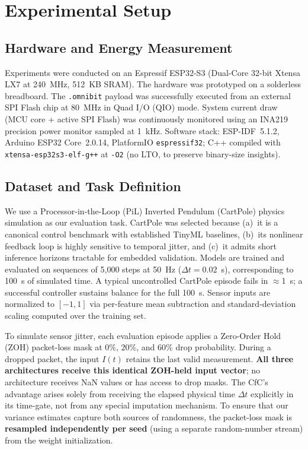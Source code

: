 \documentclass[conference]{IEEEtran}
\newcommand{\dt}{\Delta t}
\begin{document}
\section{Experimental Setup}

\subsection{Hardware and Energy Measurement}
Experiments were conducted on an Espressif ESP32-S3 (Dual-Core 32-bit Xtensa
LX7 at 240~MHz, 512~KB SRAM). The hardware was prototyped on a solderless
breadboard. The \texttt{.omnibit} payload was successfully executed from an
external SPI Flash chip at 80~MHz in Quad I/O (QIO) mode. System current draw
(MCU core + active SPI Flash) was continuously monitored using an INA219
precision power monitor sampled at 1~kHz. Software stack: ESP-IDF~5.1.2,
Arduino ESP32 Core~2.0.14, PlatformIO \texttt{espressif32}; C++ compiled with
\texttt{xtensa-esp32s3-elf-g++} at \texttt{-O2}
(no LTO, to preserve binary-size insights).

\subsection{Dataset and Task Definition}
We use a Processor-in-the-Loop (PiL) Inverted Pendulum (CartPole) physics
simulation as our evaluation task.
CartPole was selected because (a)~it is a canonical control benchmark with
established TinyML baselines, (b)~its nonlinear feedback loop is highly
sensitive to temporal jitter, and (c)~it admits short inference horizons
tractable for embedded validation.
Models are trained and evaluated on sequences of 5,000 steps at 50~Hz
($\dt = 0.02$~s), corresponding to 100~s of simulated time. A typical
uncontrolled CartPole episode fails in $\approx$1~s; a successful controller
sustains balance for the full 100~s.
Sensor inputs are normalized to $[-1, 1]$ via per-feature mean subtraction
and standard-deviation scaling computed over the training set.

To simulate sensor jitter, each evaluation episode applies a Zero-Order
Hold (ZOH) packet-loss mask at $0\%$, $20\%$, and $60\%$ drop probability.
During a dropped packet, the input $I(t)$ retains the last valid measurement.
\textbf{All three architectures receive this identical ZOH-held input vector};
no architecture receives NaN values or has access to drop masks. The CfC's
advantage arises solely from receiving the elapsed physical time $\dt$
explicitly in its time-gate, not from any special imputation mechanism.
To ensure that our variance estimates capture both sources of randomness, the
packet-loss mask is \textbf{resampled independently per seed} (using a
separate random-number stream) from the weight initialization.
\end{document}

